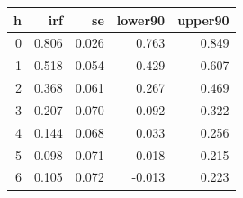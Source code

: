 \begin{tabular}{rrrrr}
\toprule
h & irf & se & lower90 & upper90 \\
\midrule
0 & 0.806 & 0.026 & 0.763 & 0.849 \\
1 & 0.518 & 0.054 & 0.429 & 0.607 \\
2 & 0.368 & 0.061 & 0.267 & 0.469 \\
3 & 0.207 & 0.070 & 0.092 & 0.322 \\
4 & 0.144 & 0.068 & 0.033 & 0.256 \\
5 & 0.098 & 0.071 & -0.018 & 0.215 \\
6 & 0.105 & 0.072 & -0.013 & 0.223 \\
\bottomrule
\end{tabular}
